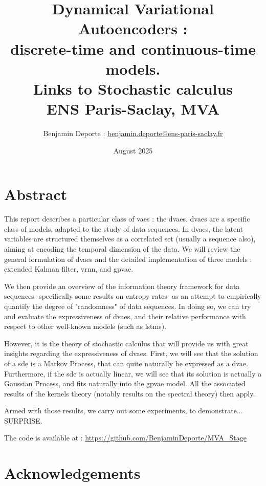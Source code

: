 \documentclass[twoside,11pt]{report}
\title{Dynamical Variational Autoencoders :\\ discrete-time and continuous-time models.\\ Links to Stochastic calculus\\
\vspace{2cm}
{\Large{ENS Paris-Saclay, MVA}}}
\author{
Benjamin Deporte : \href{mailto:benjamin.deporte@ens-paris-saclay.fr}{benjamin.deporte@ens-paris-saclay.fr}%
}
\date{August 2025}
\begin{document}
\everymath{\displaystyle}
\maketitle

\chapter*{Abstract}
This report describes a particular class of \glspl{vae} : the \glspl{dvae}. \glspl{dvae} are a specific class of models, adapted to the study of data sequences.
In \glspl{dvae}, the latent variables are structured themselves as a correlated set (usually a sequence also), aiming at encoding the temporal dimension of the data. 
We will review the general formulation of \glspl{dvae} and the detailed implementation of three models : extended Kalman filter, \gls{vrnn}, and \gls{gpvae}.

We then provide an overview of the information theory framework for data sequences -specifically some results on entropy rates- as an attempt to empirically  quantify the degree of "randomness" of data sequences.
In doing so, we can try and evaluate the expressiveness of \glspl{dvae}, and their relative performance with respect to other well-known models (such as \glspl{lstm}).

However, it is the theory of stochastic calculus that will provide us with great insights regarding the expressiveness of \glspl{dvae}.
First, we will see that the solution of a \gls{sde} is a Markov Process, that can quite naturally be expressed as a \gls{dvae}.
Furthermore, if the \gls{sde} is actually linear, we will see that its solution is actually a Gaussian Process, and fits naturally into the \gls{gpvae} model. 
All the associated results of the kernels theory (notably results on the spectral theory) then apply.

Armed with those results, we carry out some experiments, to demonstrate... SURPRISE.

The code is available at : \url{https://github.com/BenjaminDeporte/MVA_Stage}

\chapter*{Acknowledgements}



\newpage
\singlespacing
\tableofcontents

\newpage
\listoffigures
\end{document}
